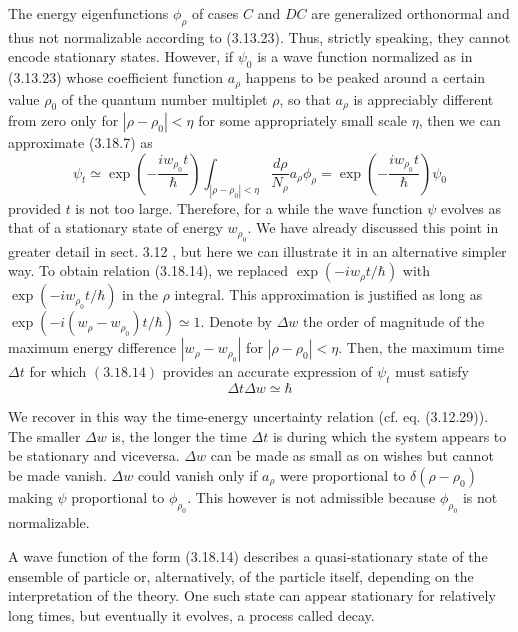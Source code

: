 \documentclass{article}
\begin{document}
The energy eigenfunctions $\phi_{\rho}$ of cases $C$ and $D C$ are generalized orthonormal and thus not normalizable according to (3.13.23). Thus, strictly speaking, they cannot encode stationary states. However, if $\psi_{0}$ is a wave function normalized as in (3.13.23) whose coefficient function $a_{\rho}$ happens to be peaked around a certain value $\rho_{0}$ of the quantum number multiplet $\rho$, so that $a_{\rho}$ is appreciably different from zero only for $\left|\rho-\rho_{0}\right|<\eta$ for some appropriately small scale $\eta$, then we can approximate (3.18.7) as
$$
\begin{equation*}
\psi_{t} \simeq \exp \left(-\frac{i w_{\rho_{0}} t}{\hbar}\right) \int_{\left|\rho-\rho_{0}\right|<\eta} \frac{d \rho}{N_{\rho}} a_{\rho} \phi_{\rho}=\exp \left(-\frac{i w_{\rho_{0}} t}{\hbar}\right) \psi_{0} \tag{3.18.14}
\end{equation*}
$$
provided $t$ is not too large. Therefore, for a while the wave function $\psi$ evolves as that of a stationary state of energy $w_{\rho_{0}}$. We have already discussed this point in greater detail in sect. 3.12 , but here we can illustrate it in an alternative simpler way. To obtain relation (3.18.14), we replaced $\exp \left(-i w_{\rho} t / \hbar\right)$ with $\exp \left(-i w_{\rho_{0}} t / \hbar\right)$ in the $\rho$ integral. This approximation is justified as long as $\exp \left(-i\left(w_{\rho}-w_{\rho_{0}}\right) t / \hbar\right) \simeq 1$. Denote by $\Delta w$ the order of magnitude of the maximum energy difference $\left|w_{\rho}-w_{\rho_{0}}\right|$ for $\left|\rho-\rho_{0}\right|<\eta$. Then, the maximum time $\Delta t$ for which $(3.18 .14)$ provides an accurate expression of $\psi_{t}$ must satisfy
$$
\begin{equation*}
\Delta t \Delta w \simeq \hbar \tag{3.18.15}
\end{equation*}
$$

We recover in this way the time-energy uncertainty relation (cf. eq. (3.12.29)). The smaller $\Delta w$ is, the longer the time $\Delta t$ is during which the system appears to
be stationary and viceversa. $\Delta w$ can be made as small as on wishes but cannot be made vanish. $\Delta w$ could vanish only if $a_{\rho}$ were proportional to $\delta\left(\rho-\rho_{0}\right)$ making $\psi$ proportional to $\phi_{\rho_{0}}$. This however is not admissible because $\phi_{\rho_{0}}$ is not normalizable.

A wave function of the form (3.18.14) describes a quasi-stationary state of the ensemble of particle or, alternatively, of the particle itself, depending on the interpretation of the theory. One such state can appear stationary for relatively long times, but eventually it evolves, a process called decay.
\end{document}
